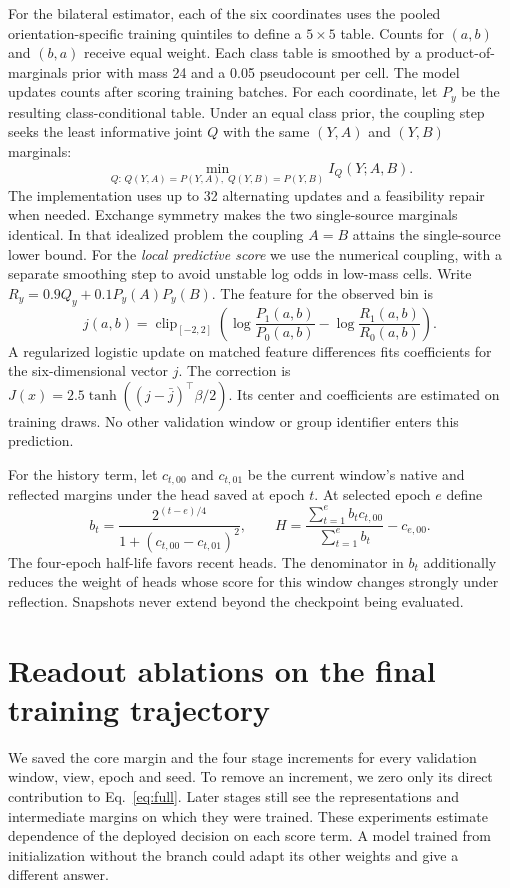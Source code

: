 For the bilateral estimator, each of the six coordinates uses the pooled orientation-specific training quintiles to define a $5\times5$ table. Counts for $(a,b)$ and $(b,a)$ receive equal weight. Each class table is smoothed by a product-of-marginals prior with mass 24 and a 0.05 pseudocount per cell. The model updates counts after scoring training batches. For each coordinate, let $P_y$ be the resulting class-conditional table. Under an equal class prior, the coupling step seeks the least informative joint $Q$ with the same $(Y,A)$ and $(Y,B)$ marginals:
\begin{equation}
\min_{Q:\,Q(Y,A)=P(Y,A),\;Q(Y,B)=P(Y,B)} I_Q(Y;A,B).
\end{equation}
The implementation uses up to 32 alternating updates and a feasibility repair when needed. Exchange symmetry makes the two single-source marginals identical. In that idealized problem the coupling $A=B$ attains the single-source lower bound. For the \emph{local predictive score} we use the numerical coupling, with a separate smoothing step to avoid unstable log odds in low-mass cells. Write $R_y=0.9Q_y+0.1P_y(A)P_y(B)$. The feature for the observed bin is
\begin{equation}
j(a,b)=\operatorname{clip}_{[-2,2]}\!\left(\log\frac{P_1(a,b)}{P_0(a,b)}
                         -\log\frac{R_1(a,b)}{R_0(a,b)}\right).
\end{equation}
A regularized logistic update on matched feature differences fits coefficients for the six-dimensional vector $j$. The correction is $J(x)=2.5\tanh((j-\bar j)^\top\beta/2)$. Its center and coefficients are estimated on training draws. No other validation window or group identifier enters this prediction.

For the history term, let $c_{t,00}$ and $c_{t,01}$ be the current window's native and reflected margins under the head saved at epoch $t$. At selected epoch $e$ define
\begin{equation}
b_t=\frac{2^{(t-e)/4}}{1+(c_{t,00}-c_{t,01})^2},\qquad
H=\frac{\sum_{t=1}^{e} b_t c_{t,00}}{\sum_{t=1}^{e}b_t}-c_{e,00}.
\end{equation}
The four-epoch half-life favors recent heads. The denominator in $b_t$ additionally reduces the weight of heads whose score for this window changes strongly under reflection. Snapshots never extend beyond the checkpoint being evaluated.

\section{Readout ablations on the final training trajectory}\label{app:ablate}
We saved the core margin and the four stage increments for every validation window, view, epoch and seed. To remove an increment, we zero only its direct contribution to Eq.~\eqref{eq:full}. Later stages still see the representations and intermediate margins on which they were trained. These experiments estimate dependence of the deployed decision on each score term. A model trained from initialization without the branch could adapt its other weights and give a different answer.

